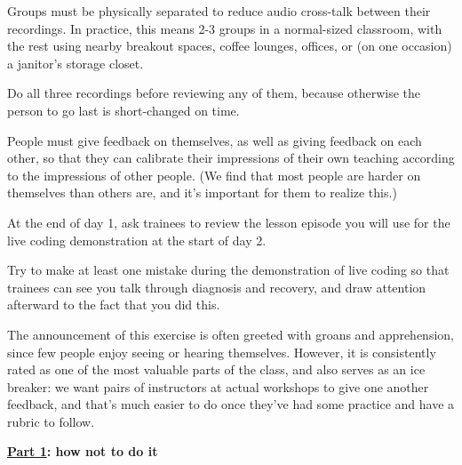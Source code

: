 \begin{gitemize}

\item
  Groups must be physically separated to reduce audio cross-talk
  between their recordings. In practice, this means 2-3 groups in a
  normal-sized classroom, with the rest using nearby breakout spaces,
  coffee lounges, offices, or (on one occasion) a janitor's storage
  closet.

\item
  Do all three recordings before reviewing any of them, because
  otherwise the person to go last is short-changed on time.

\item
  People must give feedback on themselves, as well as giving feedback
  on each other, so that they can calibrate their impressions of their
  own teaching according to the impressions of other people. (We find
  that most people are harder on themselves than others are, and it's
  important for them to realize this.)

\item
  At the end of day 1, ask trainees to review the lesson episode you
  will use for the live coding demonstration at the start of day 2.

\item
  Try to make at least one mistake during the demonstration of live
  coding so that trainees can see you talk through diagnosis and
  recovery, and draw attention afterward to the fact that you did
  this.

\end{gitemize}

The announcement of this exercise is often greeted with groans and
apprehension, since few people enjoy seeing or hearing themselves.
However, it is consistently rated as one of the most valuable parts of
the class, and also serves as an ice breaker: we want pairs of
instructors at actual workshops to give one another feedback, and
that's much easier to do once they've had some practice and have a
rubric to follow.


\noindent
\textbf{\href{https://youtu.be/bXxBeNkKmJE}{Part 1}: how not to do it}

